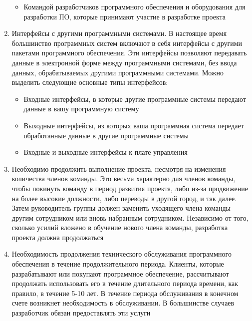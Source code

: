 \documentclass{../industrial-development}
\begin{document}
\begin{enumerate}
\begin{itemize}
	\item Командой разработчиков программного обеспечения и оборудования для разработки ПО, которые принимают участие в разработке проекта
		\end{itemize}
\item Интерфейсы с другими программными системами. В настоящее время большинство программных систем включают в себя интерфейсы с другими пакетами программного обеспечения. Эти интерфейсы позволяют передавать данные в электронной форме между программными системами, без ввода данных, обрабатываемых другими программными системами. Можно выделить следующие основные типы интерфейсов:
		 \begin{itemize}
	\item Входные интерфейсы, в которые другие программные системы передают данные в вашу программную систему
	\item Выходные интерфейсы, из которых ваша программная система передает обработанные данные в другие программные системы
	\item Входные и выходные интерфейсы к плате управления 
		\end{itemize}
\item  Необходимо продолжить выполнение проекта, несмотря на изменения количества членов команды. Это весьма характерно для членов команды, чтобы покинуть команду в период развития проекта, либо из-за продвижение на более высокие должности, либо переводы в другой город, и так далее. Затем руководитель группы должен заменить уходящего члена команды другим сотрудником или вновь набранным сотрудником. Независимо от того, сколько усилий вложено в обучение нового члена команды, разработка проекта должна продолжаться
\item Необходимость продолжения технического обслуживания программного обеспечения в течение продолжительного периода. Клиенты, которые разрабатывают или покупают программное обеспечение, рассчитывают продолжать использовать его в течение длительного периода времени, как правило, в течение 5-10 лет. В течение периода обслуживания в конечном счете возникнет необходимость в обслуживании. В большинстве случаев разработчик обязан предоставлять эти услуги~\cite[с.~7--10]{SQA-Galin}
  	\end{enumerate}
\end{document}
